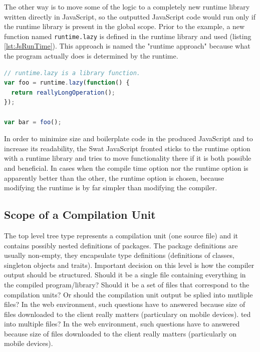 \documentclass[12pt,a4paper]{report}
\begin{document}
The other way is to move some of the logic to a completely new runtime library written directly in JavaScript, so the outputted JavaScript code would run only if the runtime library is present in the global scope. Prior to the example, a new function named \texttt{runtime.lazy} is defined in the runtime library and used (listing \ref{lst:JsRunTime}). This approach is named the "runtime approach" because what the program actually does is determined by the runtime.

\begin{lstlisting}[language=JavaScript,caption={Runtime option outcome.},label={lst:JsRunTime}]
// runtime.lazy is a library function.
var foo = runtime.lazy(function() {
  return reallyLongOperation();
});

var bar = foo();
\end{lstlisting}

In order to minimize size and boilerplate code in the produced JavaScript and to increase its readability, the Swat JavaScript fronted sticks to the runtime option with a runtime library and tries to move functionality there if it is both possible and beneficial. In cases when the compile time option nor the runtime option is apparently better than the other, the runtime option is chosen, because modifying the runtime is by far simpler than modifying the compiler.

\subsection{Scope of a Compilation Unit}

The top level tree type represents a compilation unit (one source file) and it contains possibly nested definitions of packages. The package definitions are usually non-empty, they encapsulate type definitions (definitions of classes, singleton objects and traits). Important decision on this level is how the compiler output should be structured. Should it be a single file containing everything in the compiled program/library? Should it be a set of files that correspond to the compilation units? Or should the compilation unit output be splied into mutliple files? In the web environment, such questions have to answered because size of files downloaded to the client really matters (particulary on mobile devices).
ted into multiple files? In the web environment, such questions have to answered because size of files downloaded to the client really matters (particularly on mobile devices).
\end{document}
